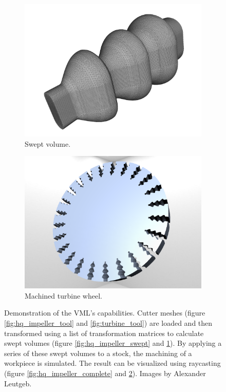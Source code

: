 \begin{figure}[h]
\begin{subfigure}[t]{0.32\textwidth}
			\includegraphics[width=\textwidth]{images/turbine_swept}
			\caption{Swept volume.}
			\label{fig:turbine_swept}
		\end{subfigure}
		\begin{subfigure}[t]{0.32\textwidth}
			\centering
			\includegraphics[width=\textwidth]{images/turbine_complete}
			\caption{Machined turbine wheel.}
			\label{fig:turbine_complete}
		\end{subfigure}
	\caption{
		Demonstration of the VML's capabilities.
		Cutter meshes (figure \ref{fig:hq_impeller_tool} and \ref{fig:turbine_tool}) are loaded and then transformed using a list of transformation matrices to calculate swept volumes (figure \ref{fig:hq_impeller_swept} and \ref{fig:turbine_swept}).
		By applying a series of these swept volumes to a stock, the machining of a workpiece is simulated.
		The result can be visualized using raycasting (figure \ref{fig:hq_impeller_complete} and \ref{fig:turbine_complete}).
		Images by Alexander Leutgeb.
	}
	\label{fig:vml_demo}
\end{figure}


